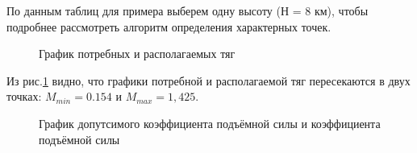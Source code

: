 По данным таблиц для примера выберем одну высоту (Н = 8 км), чтобы подробнее рассмотреть алгоритм определения характерных точек.

\begin{figure}[H]
    \caption{График потребных и располагаемых тяг}
    \label{fig:График потребныйх и распологаемых тяг}
\end{figure}

Из рис.\ref{fig:График потребныйх и распологаемых тяг} видно, что графики потребной и располагаемой тяг пересекаются в двух точках: $M_{min} = 0.154$ и $M_{max} = 1,425$.

\begin{figure}[H]
    \caption{График допутсимого коэффициента подъёмной силы и коэффициента подъёмной силы}
    \label{fig:График допутсимого коэффициента подъёмной силы и коэффициента подъёмной силы}
\end{figure}

